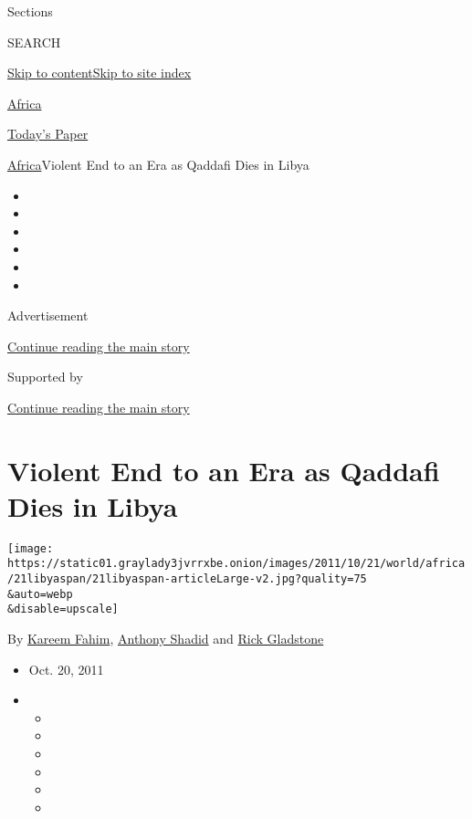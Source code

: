 Sections

SEARCH

\protect\hyperlink{site-content}{Skip to
content}\protect\hyperlink{site-index}{Skip to site index}

\href{https://www.nytimes3xbfgragh.onion/section/world/africa}{Africa}

\href{https://myaccount.nytimes3xbfgragh.onion/auth/login?response_type=cookie\&client_id=vi}{}

\href{https://www.nytimes3xbfgragh.onion/section/todayspaper}{Today's
Paper}

\href{/section/world/africa}{Africa}\textbar{}Violent End to an Era as
Qaddafi Dies in Libya

\begin{itemize}
\item
\item
\item
\item
\item
\item
\end{itemize}

Advertisement

\protect\hyperlink{after-top}{Continue reading the main story}

Supported by

\protect\hyperlink{after-sponsor}{Continue reading the main story}

\hypertarget{violent-end-to-an-era-as-qaddafi-dies-in-libya}{%
\section{Violent End to an Era as Qaddafi Dies in
Libya}\label{violent-end-to-an-era-as-qaddafi-dies-in-libya}}

\texttt{[image: https://static01.graylady3jvrrxbe.onion/images/2011/10/21/world/africa/21libyaspan/21libyaspan-articleLarge-v2.jpg?quality=75\\\&auto=webp\\\&disable=upscale]}

By \href{https://www.nytimes3xbfgragh.onion/by/kareem-fahim}{Kareem
Fahim},
\href{https://www.nytimes3xbfgragh.onion/by/anthony-shadid}{Anthony
Shadid} and
\href{https://www.nytimes3xbfgragh.onion/by/rick-gladstone}{Rick
Gladstone}

\begin{itemize}
\item
  Oct. 20, 2011
\item
  \begin{itemize}
  \item
  \item
  \item
  \item
  \item
  \item
  \end{itemize}
\end{itemize}

